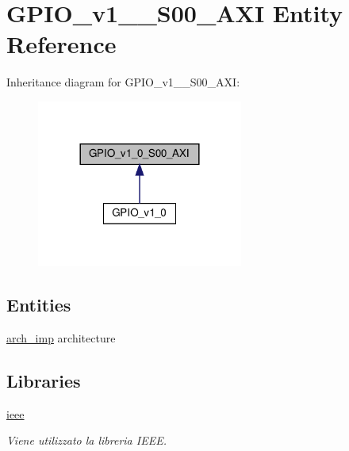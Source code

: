 \hypertarget{classGPIO__v1__0__S00__AXI}{}\section{G\+P\+I\+O\+\_\+v1\+\_\+\_\+\+S00\+\_\+\+A\+XI Entity Reference}
\label{classGPIO__v1__0__S00__AXI}


Inheritance diagram for G\+P\+I\+O\+\_\+v1\+\_\+\_\+\+S00\+\_\+\+A\+XI\+:\nopagebreak
\begin{figure}[H]
\begin{center}
\leavevmode
\includegraphics[width=192pt]{classGPIO__v1__0__S00__AXI__inherit__graph}
\end{center}
\end{figure}
\subsection*{Entities}
\begin{DoxyCompactItemize}
\item 
\hyperlink{classGPIO__v1__0__S00__AXI_1_1arch__imp}{arch\+\_\+imp} architecture
\end{DoxyCompactItemize}
\subsection*{Libraries}
 \begin{DoxyCompactItemize}
\item 
\mbox{\label{classGPIO__v1__0__S00__AXI_a0a6af6eef40212dbaf130d57ce711256}} 
\hyperlink{classGPIO__v1__0__S00__AXI_a0a6af6eef40212dbaf130d57ce711256}{ieee} 
\begin{DoxyCompactList}\small\item\em Viene utilizzato la libreria I\+E\+EE. \end{DoxyCompactList}\end{DoxyCompactItemize}
